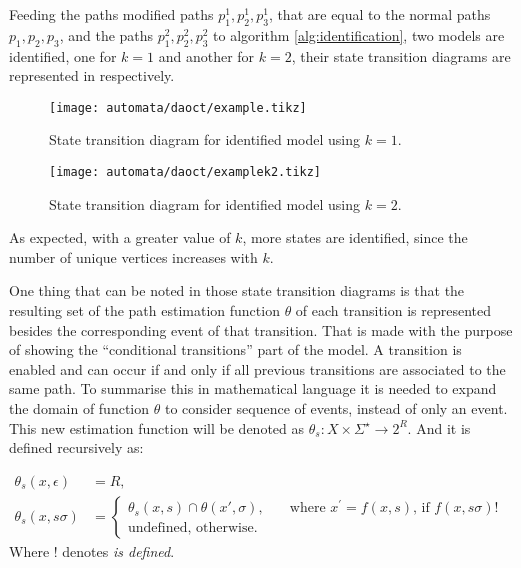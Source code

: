 \vspace{1cm}

Feeding the paths modified paths $p_1^1,p_2^1,p_3^1$, that are equal to the
normal paths $p_1,p_2,p_3$, and the paths $p_1^2,p_2^2,p_3^2$ to algorithm
\ref{alg:identification}, two models are identified, one for $k=1$ and another for
$k=2$, their state transition diagrams are represented in  respectively. 

\begin{figure}[H]
  \centering \texttt{[image: automata/daoct/example.tikz]}
  \caption{State transition diagram for identified model using $k=1$.}
  \label{fig:examplek1}
\end{figure}


\begin{figure}[H]
  \centering \texttt{[image: automata/daoct/examplek2.tikz]}
  \caption{State transition diagram for identified model using $k=2$.}
  \label{fig:examplek2}
\end{figure}

As expected, with a greater value of $k$, more states are identified, since the
number of unique vertices increases with $k$.

One thing that can be noted in those state transition diagrams is that the
resulting set
of the path estimation function $\theta$ of each transition is represented
besides the corresponding event of that transition. That is made with the
purpose of showing the ``conditional transitions'' part of the \DAOCT{} model. A
transition is enabled and can occur if and only if all previous transitions are
associated to the same path. To summarise this in mathematical language it is
needed to expand the domain of function $\theta$ to consider sequence of events,
instead of only an event. This new estimation function will be denoted as
$\theta_s : X \times \Sigma^\star \rightarrow 2^R$. And it is defined
recursively as:

\begin{align}
  \theta_s(x,\epsilon)&=R,\nonumber\\
  \theta_s(x,s\sigma)&=
                       \begin{cases}
                         \theta_s(x,s) \cap \theta(x',\sigma),       & \quad \text{where $x^\prime = f(x,s)$, if $f(x,s\sigma)!$ }\\
                         \text{undefined, otherwise.}  &
                       \end{cases}
\end{align}
Where ! denotes \emph{is defined}.

